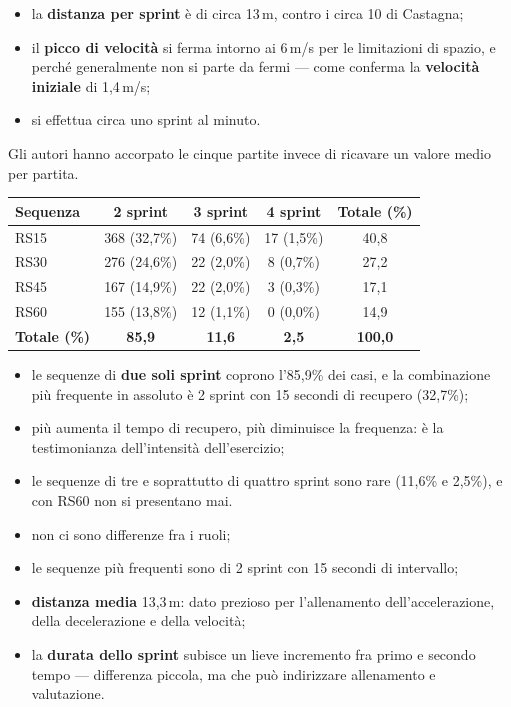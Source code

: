 \begin{itemize}
  \item la \textbf{distanza per sprint} è di circa 13\,m, contro i circa 10 di Castagna;
  \item il \textbf{picco di velocità} si ferma intorno ai 6\,m/s per le limitazioni di spazio, e
    perché generalmente non si parte da fermi --- come conferma la \textbf{velocità iniziale} di
    1,4\,m/s;
  \item si effettua circa uno sprint al minuto.
\end{itemize}

Gli autori hanno accorpato le cinque partite invece di ricavare un valore medio per partita.

\begin{center}
\footnotesize
\begin{tabular}{|l|c|c|c|c|}
\hline
\textbf{Sequenza} & \textbf{2 sprint} & \textbf{3 sprint} & \textbf{4 sprint} & \textbf{Totale (\%)} \\
\hline
RS15        & 368 (32,7\%) & 74 (6,6\%)  & 17 (1,5\%) & 40,8 \\
RS30        & 276 (24,6\%) & 22 (2,0\%)  & 8 (0,7\%)  & 27,2 \\
RS45        & 167 (14,9\%) & 22 (2,0\%)  & 3 (0,3\%)  & 17,1 \\
RS60        & 155 (13,8\%) & 12 (1,1\%)  & 0 (0,0\%)  & 14,9 \\
\hline
\textbf{Totale (\%)} & \textbf{85,9} & \textbf{11,6} & \textbf{2,5} & \textbf{100,0} \\
\hline
\end{tabular}
\end{center}

\begin{itemize}
  \item le sequenze di \textbf{due soli sprint} coprono l'85,9\% dei casi, e la combinazione più
    frequente in assoluto è 2 sprint con 15 secondi di recupero (32,7\%);
  \item più aumenta il tempo di recupero, più diminuisce la frequenza: è la testimonianza
    dell'intensità dell'esercizio;
  \item le sequenze di tre e soprattutto di quattro sprint sono rare (11,6\% e 2,5\%), e con RS60
    non si presentano mai.
\end{itemize}

\begin{itemize}
  \item non ci sono differenze fra i ruoli;
  \item le sequenze più frequenti sono di 2 sprint con 15 secondi di intervallo;
  \item \textbf{distanza media} 13,3\,m: dato prezioso per l'allenamento dell'accelerazione, della
    decelerazione e della velocità;
  \item la \textbf{durata dello sprint} subisce un lieve incremento fra primo e secondo tempo ---
    differenza piccola, ma che può indirizzare allenamento e valutazione.
\end{itemize}

